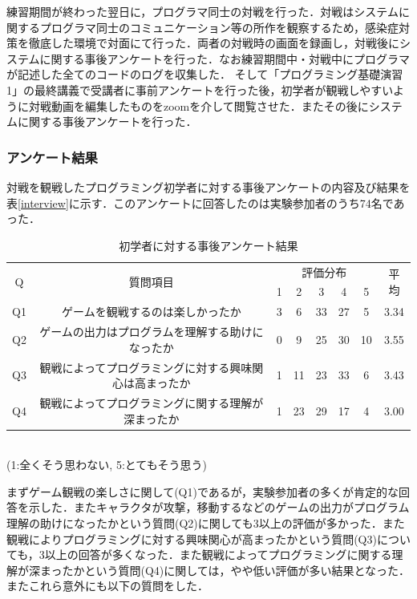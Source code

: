 練習期間が終わった翌日に，プログラマ同士の対戦を行った．対戦はシステムに関するプログラマ同士のコミュニケーション等の所作を観察するため，感染症対策を徹底した環境で対面にて行った．両者の対戦時の画面を録画し，対戦後にシステムに関する事後アンケートを行った．なお練習期間中・対戦中にプログラマが記述した全てのコードのログを収集した．
そして「プログラミング基礎演習1」の最終講義で受講者に事前アンケートを行った後，初学者が観戦しやすいように対戦動画を編集したものをzoomを介して閲覧させた．またその後にシステムに関する事後アンケートを行った．

\subsubsection{アンケート結果}

対戦を観戦したプログラミング初学者に対する事後アンケートの内容及び結果を表\ref{interview}に示す．このアンケートに回答したのは実験参加者のうち74名であった．

\begin{table}[h]
  \begin{center}
    \caption{初学者に対する事後アンケート結果}
    \label{beginner_interview}
      \begin{tabular}{|c|c|c|c|c|c|c|c|} \hline
        \multirow{2}{*}{Q} & \multirow{2}{*}{質問項目} & \multicolumn{5}{c}{評価分布} & \multirow{2}{*}{平均} \\
        & & 1 & 2 & 3 & 4 & 5 & \\ \hline\hline
        Q1 & ゲームを観戦するのは楽しかったか & 3 & 6 & 33 & 27 & 5 & 3.34\\ \hline
        Q2 & ゲームの出力はプログラムを理解する助けになったか & 0 & 9 & 25 & 30 & 10 & 3.55\\ \hline
        Q3 & 観戦によってプログラミングに対する興味関心は高まったか & 1 & 11 & 23 & 33 & 6 & 3.43\\ \hline
        Q4 & 観戦によってプログラミングに関する理解が深まったか & 1 & 23 & 29 & 17 & 4 & 3.00\\ \hline
      \end{tabular}
      \\(1:全くそう思わない, 5:とてもそう思う)
  \end{center}
\end{table}

まずゲーム観戦の楽しさに関して(Q1)であるが，実験参加者の多くが肯定的な回答を示した．またキャラクタが攻撃，移動するなどのゲームの出力がプログラム理解の助けになったかという質問(Q2)に関しても3以上の評価が多かった．また観戦によりプログラミングに対する興味関心が高まったかという質問(Q3)についても，3以上の回答が多くなった．また観戦によってプログラミングに関する理解が深まったかという質問(Q4)に関しては，やや低い評価が多い結果となった．またこれら意外にも以下の質問をした．

